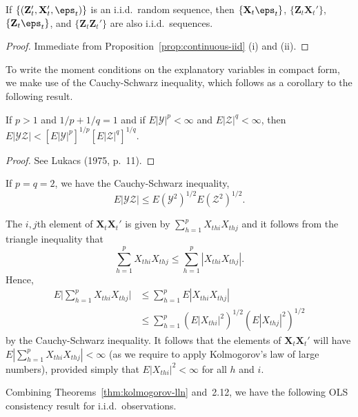 \begin{proposition}\label{prop:iid-products}
If $\{(\mathbf{Z}_t', \mathbf{X}_t', \eps_t)\}$ is an i.i.d.\ random sequence, then $\{\mathbf{X}_t \eps_t\}$, $\{\mathbf{Z}_t \mathbf{X}_t'\}$, $\{\mathbf{Z}_t \eps_t\}$, and $\{\mathbf{Z}_t \mathbf{Z}_t'\}$ are also i.i.d.\ sequences.
\end{proposition}

\begin{proof}
Immediate from Proposition~\ref{prop:continuous-iid} (i) and (ii). \qedhere
\end{proof}

To write the moment conditions on the explanatory variables in compact form, we make use of the Cauchy-Schwarz inequality, which follows as a corollary to the following result.

\begin{proposition}\label{prop:holder}
If $p > 1$ and $1/p + 1/q = 1$ and if $E|\mathcal{Y}|^p < \infty$ and $E|\mathcal{Z}|^q < \infty$, then $E|\mathcal{Y}\mathcal{Z}| < [E|\mathcal{Y}|^p]^{1/p} [E|\mathcal{Z}|^q]^{1/q}$.
\end{proposition}

\begin{proof}
See Lukacs (1975, p.~11). \qedhere
\end{proof}

If $p = q = 2$, we have the Cauchy-Schwarz inequality,
\[
E|\mathcal{Y}\mathcal{Z}| \leq E(\mathcal{Y}^2)^{1/2} E(\mathcal{Z}^2)^{1/2}.
\]

The $i,j$th element of $\mathbf{X}_t \mathbf{X}_t'$ is given by $\sum_{h=1}^{p} X_{thi} X_{thj}$ and it follows from the triangle inequality that
\[
\sum_{h=1}^{p} X_{thi} X_{thj} \leq \sum_{h=1}^{p} |X_{thi} X_{thj}|.
\]
Hence,
\begin{align*}
E\bigl|\sum_{h=1}^{p} X_{thi} X_{thj}\bigr| &\leq \sum_{h=1}^{p} E|X_{thi} X_{thj}| \\
&\leq \sum_{h=1}^{p} (E|X_{thi}|^2)^{1/2} (E|X_{thj}|^2)^{1/2}
\end{align*}
by the Cauchy-Schwarz inequality. It follows that the elements of $\mathbf{X}_t \mathbf{X}_t'$ will have $E|\sum_{h=1}^{p} X_{thi} X_{thj}| < \infty$ (as we require to apply Kolmogorov's law of large numbers), provided simply that $E|X_{thi}|^2 < \infty$ for all $h$ and $i$.

Combining Theorems~\ref{thm:kolmogorov-lln} and~2.12, we have the following OLS consistency result for i.i.d.\ observations.

